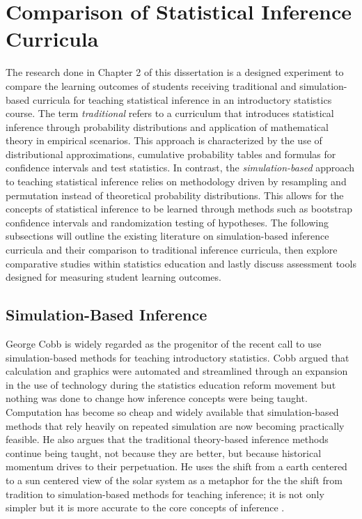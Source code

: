 \documentclass[11pt]{isuthesis}\usepackage[]{graphicx}\usepackage[]{color}
\begin{document}

\section{Comparison of Statistical Inference Curricula} 

The research done in Chapter 2 of this dissertation is a designed experiment to compare the learning outcomes of students receiving traditional and simulation-based curricula for teaching statistical inference in an introductory statistics course.  The term \textit{traditional} refers to a curriculum that introduces statistical inference through probability distributions and application of mathematical theory in empirical scenarios. This approach is characterized by the use of distributional approximations, cumulative probability tables and formulas for confidence intervals and test statistics. In contrast, the \textit{simulation-based} approach to teaching statistical inference relies on methodology driven by resampling and permutation instead of theoretical probability distributions. This allows for the concepts of statistical inference to be learned through methods such as bootstrap confidence intervals and randomization testing of hypotheses. The following subsections will outline the existing literature on simulation-based inference curricula and their comparison to traditional inference curricula, then explore comparative studies within statistics education and lastly discuss assessment tools designed for measuring student learning outcomes.


\subsection{Simulation-Based Inference} 

George Cobb is widely regarded as the progenitor of the recent call to use simulation-based methods for teaching introductory statistics. Cobb argued that calculation and graphics were automated and streamlined through an expansion in the use of technology during the statistics education reform movement but nothing was done to change how inference concepts were being taught. Computation has become so cheap and widely available that simulation-based methods that rely heavily on repeated simulation are now becoming practically feasible. He also argues that the traditional theory-based inference methods continue being taught, not because they are better, but because historical momentum drives to their perpetuation. He uses the shift from a earth centered to a sun centered view of the solar system as a metaphor for the the shift from tradition to simulation-based methods for teaching inference; it is not only simpler but it is more accurate to the core concepts of inference \citep{Cobb2007}.
\end{document}
